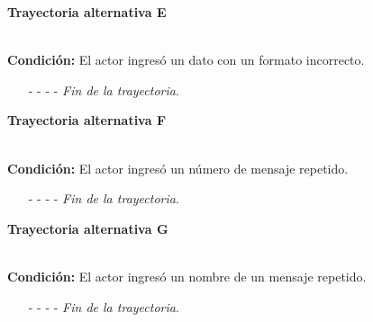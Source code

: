 \hypertarget{CU9-1:TAE}{\textbf{Trayectoria alternativa E}}\\
\noindent \textbf{Condición:} El actor ingresó un dato con un formato incorrecto.
\begin{enumerate}
	\UCpaso[\UCsist] Muestra el mensaje  señalando el campo que presenta el error en la pantalla .
	\UCpaso Regresa al paso \ref{CU9.1-P3} de la trayectoria principal o al paso \ref{CU9.1-TA2} de la trayectoria Alternativa A.
	\item[- -] - - {\em {Fin de la trayectoria}}.
\end{enumerate}
\hypertarget{CU9-1:TAF}{\textbf{Trayectoria alternativa F}}\\
\noindent \textbf{Condición:} El actor ingresó un número de mensaje repetido.
\begin{enumerate}
	\UCpaso[\UCsist] Muestra el mensaje  señalando el campo que presenta la duplicidad en la pantalla .
	\UCpaso Regresa al paso \ref{CU9.1-P3} de la trayectoria principal.
	\item[- -] - - {\em {Fin de la trayectoria}}.
\end{enumerate}
\hypertarget{CU9-1:TAG}{\textbf{Trayectoria alternativa G}}\\
\noindent \textbf{Condición:} El actor ingresó un nombre de un mensaje repetido.
\begin{enumerate}
	\UCpaso[\UCsist] Muestra el mensaje  señalando el campo que presenta la duplicidad en la pantalla .
	\UCpaso Regresa al paso \ref{CU9.1-P3} de la trayectoria principal.
	\item[- -] - - {\em {Fin de la trayectoria}}.
\end{enumerate}
